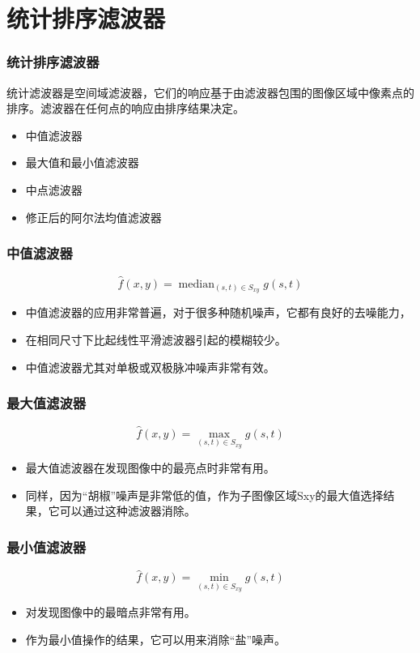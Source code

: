 \documentclass{beamer}
\DeclareMathOperator*{\median}{median}
\begin{document}
\section{统计排序滤波器}
\label{sec-6}
\begin{frame}
\frametitle{统计排序滤波器}
\label{sec-6-1}

统计滤波器是空间域滤波器，它们的响应基于由滤波器包围的图像区域中像素点的排序。滤波器在任何点的响应由排序结果决定。

\begin{itemize}
\item 中值滤波器
\item 最大值和最小值滤波器
\item 中点滤波器
\item 修正后的阿尔法均值滤波器
\end{itemize}
\end{frame}
\begin{frame}
\frametitle{中值滤波器}
\label{sec-6-2}

\[  \hat f(x,y) = \median_{(s,t)\in S_{xy}} g(s,t) \]
\begin{itemize}
\item 中值滤波器的应用非常普遍，对于很多种随机噪声，它都有良好的去噪能力，
\item 在相同尺寸下比起线性平滑滤波器引起的模糊较少。
\item 中值滤波器尤其对单极或双极脉冲噪声非常有效。
\end{itemize}
\end{frame}
\begin{frame}
\frametitle{最大值滤波器}
\label{sec-6-3}

\[  \hat f(x,y) = \max_{(s,t)\in S_{xy}}g(s,t) \]
\begin{itemize}
\item 最大值滤波器在发现图像中的最亮点时非常有用。
\item 同样，因为“胡椒”噪声是非常低的值，作为子图像区域Sxy的最大值选择结果，它可以通过这种滤波器消除。
\end{itemize}
\end{frame}
\begin{frame}
\frametitle{最小值滤波器}
\label{sec-6-4}

\[  \hat f(x,y) = \min_{(s,t)\in S_{xy}}g(s,t) \]
\begin{itemize}
\item 对发现图像中的最暗点非常有用。
\item 作为最小值操作的结果，它可以用来消除“盐”噪声。
\end{itemize}
\end{frame}
\end{document}
